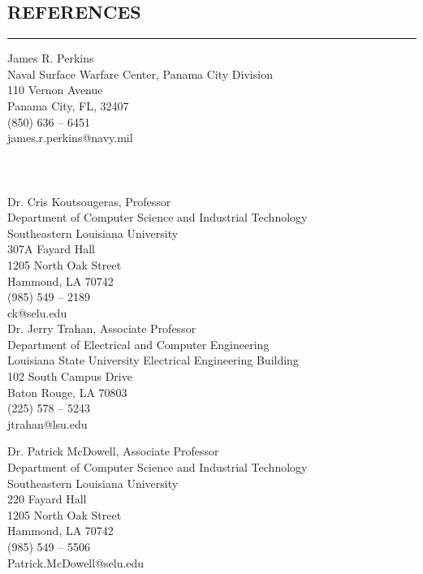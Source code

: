 \documentclass{res}
\begin{document}
\begin{resume}
	   
\section{REFERENCES}
	\vspace{0.005in}	
	\rule{\textwidth}{0.5pt}
	\begin{multicols}{2}
		James R. Perkins\\
		Naval Surface Warfare Center, Panama City Division\\
		110 Vernon Avenue \\
		Panama City, FL, 32407 \\
		(850) 636 – 6451 \\
		james.r.perkins@navy.mil\\
		\\\\\\
		Dr. Cris Koutsougeras, Professor \\
		Department of Computer Science and Industrial Technology \\
		Southeastern Louisiana University \\
		307A Fayard Hall \\
		1205 North Oak Street \\
		Hammond, LA 70742 \\
		(985) 549 – 2189 \\
		ck@selu.edu\\
		
		Dr. Jerry Trahan, Associate Professor \\
		Department of Electrical and Computer Engineering \\
		Louisiana State University Electrical Engineering Building \\
		102 South Campus Drive \\
		Baton Rouge, LA 70803 \\
		(225) 578 – 5243 \\
		jtrahan@lsu.edu
		
		Dr. Patrick McDowell, Associate Professor \\
		Department of Computer Science and Industrial Technology\\
		Southeastern Louisiana University \\
		220 Fayard Hall \\
		1205 North Oak Street \\
		Hammond, LA 70742 \\
		(985) 549 – 5506 \\
		Patrick.McDowell@selu.edu\\
	\end{multicols}
	









\end{resume}
\end{document}
